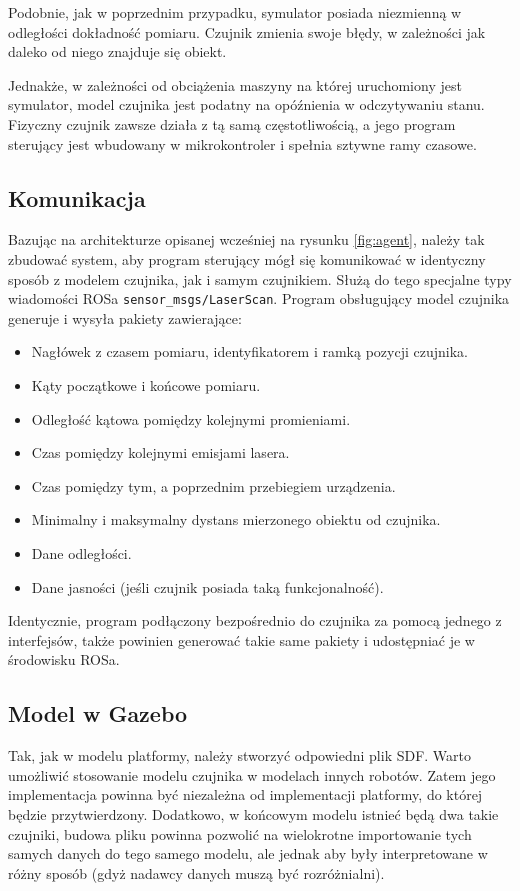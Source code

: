 		Podobnie, jak w poprzednim przypadku, symulator posiada niezmienną w odległości dokładność pomiaru.
		Czujnik zmienia swoje błędy, w zależności jak daleko od niego znajduje się obiekt.

		Jednakże, w zależności od obciążenia maszyny na której uruchomiony jest symulator, model czujnika jest podatny na opóźnienia w odczytywaniu stanu.
		Fizyczny czujnik zawsze działa z tą samą częstotliwością, a jego program sterujący jest wbudowany w mikrokontroler i spełnia sztywne ramy czasowe.

	\subsection{Komunikacja}
		Bazując na architekturze opisanej wcześniej na rysunku \ref{fig:agent}, należy tak zbudować system, aby program sterujący mógł się komunikować w identyczny sposób z 
		modelem czujnika, jak i samym czujnikiem.
		Służą do tego specjalne typy wiadomości ROSa \texttt{sensor\_msgs/LaserScan}.
		Program obsługujący model czujnika generuje i wysyła pakiety zawierające:
		\begin{itemize}
			\item Nagłówek z czasem pomiaru, identyfikatorem i ramką pozycji czujnika.
			\item Kąty początkowe i końcowe pomiaru.
			\item Odległość kątowa pomiędzy kolejnymi promieniami.
			\item Czas pomiędzy kolejnymi emisjami lasera.
			\item Czas pomiędzy tym, a poprzednim przebiegiem urządzenia.
			\item Minimalny i maksymalny dystans mierzonego obiektu od czujnika.
			\item Dane odległości.
			\item Dane jasności (jeśli czujnik posiada taką funkcjonalność).
		\end{itemize}

		Identycznie, program podłączony bezpośrednio do czujnika za pomocą jednego z interfejsów, także powinien generować takie same pakiety i udostępniać je w środowisku ROSa.

	\subsection{Model w Gazebo}
		Tak, jak w modelu platformy, należy stworzyć odpowiedni plik SDF. 
		Warto umożliwić stosowanie modelu czujnika w modelach innych robotów. 
		Zatem jego implementacja powinna być niezależna od implementacji platformy, do której będzie przytwierdzony.
		Dodatkowo, w końcowym modelu istnieć będą dwa takie czujniki, budowa pliku powinna pozwolić na wielokrotne importowanie tych samych danych do tego samego modelu, 
		ale jednak aby były interpretowane w różny sposób (gdyż nadawcy danych muszą być rozróżnialni).

